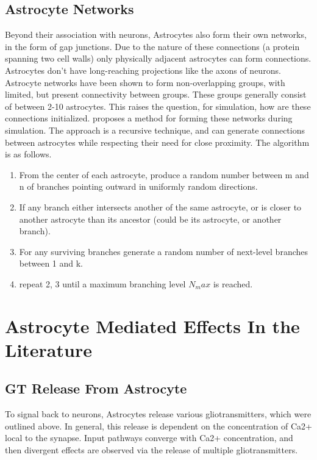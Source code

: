     \subsection{Astrocyte Networks}
    Beyond their association with neurons, Astrocytes also form their own
    networks, in the form of gap junctions. Due to the nature of these
    connections (a protein spanning two cell walls) only physically adjacent
    astrocytes can form connections. Astrocytes don't have long-reaching
    projections like the axons of neurons. Astrocyte networks have been shown to
    form non-overlapping groups, with limited, but present connectivity between
    groups. These groups generally consist of between 2-10 astrocytes. This
    raises the question, for simulation, how are these connections
    initialized. \cite{postnov_2009} proposes a method for forming these
    networks during simulation. The approach is a recursive technique, and can
    generate connections between astrocytes while respecting their need for
    close proximity. The algorithm is as follows.
    \begin{enumerate}
        \item From the center of each astrocyte, produce a random number between
          m and n of branches pointing outward in uniformly random directions.
        \item If any branch either intersects another of the same astrocyte, or
          is closer to another astrocyte than its ancestor (could be its
          astrocyte, or another branch).\
        \item For any surviving branches generate a random number of next-level
          branches between 1 and k.
        \item repeat 2, 3 until a maximum branching level $N_max$ is reached.
    \end{enumerate}
    
    
    \section{Astrocyte Mediated Effects In the Literature}
    \subsection{GT Release From Astrocyte}
    To signal back to neurons, Astrocytes release various gliotransmitters,
    which were outlined above. In general, this release is dependent on the
    concentration of Ca2+ local to the synapse. Input pathways converge with
    Ca2+ concentration, and then divergent effects are observed via the release
    of multiple gliotransmitters.

